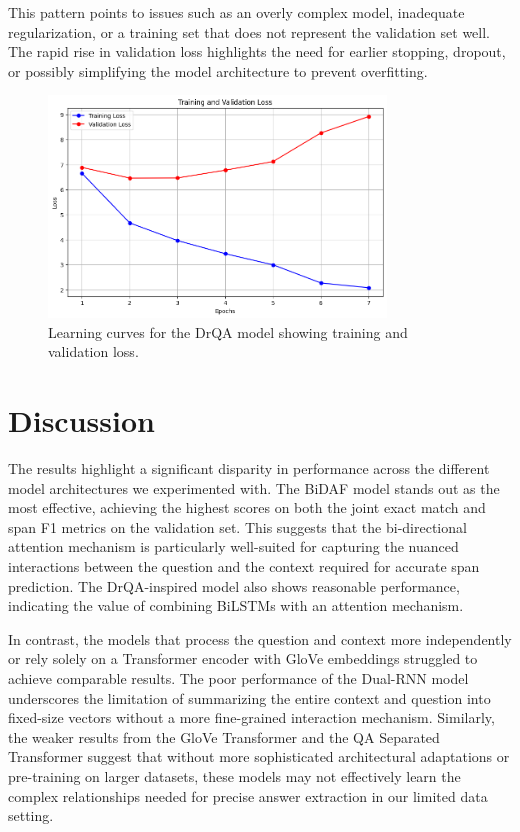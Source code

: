 \documentclass[runningheads]{llncs}
\begin{document}
This pattern points to issues such as an overly complex model, inadequate regularization, or a training set that does not represent the validation set well. The rapid rise in validation loss highlights the need for earlier stopping, dropout, or possibly simplifying the model architecture to prevent overfitting.
\begin{figure}[H]
\centering
\includegraphics[width=0.8\textwidth]{images/drqa_loss.png}
\caption{Learning curves for the DrQA model showing training and validation loss.}
\label{fig:drqa_loss}
\end{figure}
\section{Discussion}
The results highlight a significant disparity in performance across the different model architectures we experimented with. The BiDAF model stands out as the most effective, achieving the highest scores on both the joint exact match and span F1 metrics on the validation set. This suggests that the bi-directional attention mechanism is particularly well-suited for capturing the nuanced interactions between the question and the context required for accurate span prediction. The DrQA-inspired model also shows reasonable performance, indicating the value of combining BiLSTMs with an attention mechanism.

In contrast, the models that process the question and context more independently or rely solely on a Transformer encoder with GloVe embeddings struggled to achieve comparable results. The poor performance of the Dual-RNN model underscores the limitation of summarizing the entire context and question into fixed-size vectors without a more fine-grained interaction mechanism. Similarly, the weaker results from the GloVe Transformer and the QA Separated Transformer suggest that without more sophisticated architectural adaptations or pre-training on larger datasets, these models may not effectively learn the complex relationships needed for precise answer extraction in our limited data setting.
\end{document}
